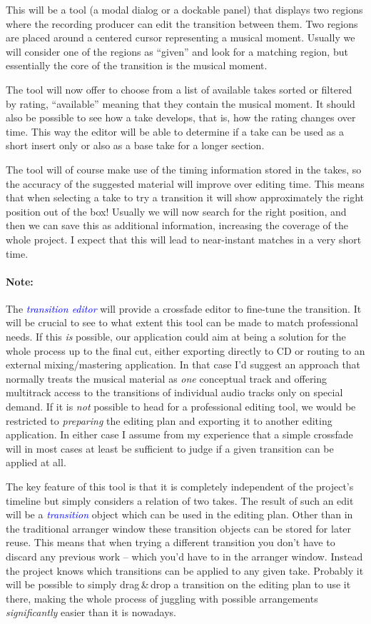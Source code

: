 \documentclass[11pt,a4paper]{article}
\newcommand*{\term}[1]{\textcolor{blue}{\emph{#1}}}
\begin{document}
This will be a tool (a modal dialog or a dockable panel) that displays two
regions where the recording producer can edit the transition between them.
Two regions are placed around a centered cursor representing a musical moment.
Usually we will consider one of the regions as “given” and look for a matching
region, but essentially the core of the transition is the musical moment.

The tool will now offer to choose from a list of available takes sorted or filtered
by rating, “available” meaning that they contain the musical moment.
It should also be possible to see how a take develops, that is, how the rating
changes over time.
This way the editor will be able to determine if a take can be used as a short
insert only or also as a base take for a longer section.

The tool will of course make use of the timing information stored in the takes,
so the accuracy of the suggested material will improve over editing time.
This means that when selecting a take to try a transition it will show
approximately the right position out of the box!
Usually we will now search for the right position, and then we can save this as
additional information, increasing the coverage of the whole project.
I expect that this will lead to near-instant matches in a very short time.

\paragraph{Note:}
The \term{transition editor} will provide a crossfade editor to fine-tune the
transition.
It will be crucial to see to what extent this tool can be made to match
professional needs.
If this \emph{is} possible, our application could aim at being a solution for the
whole process up to the final cut, either exporting directly to CD or routing to
an external mixing/mastering application.
In that case I'd suggest an approach that normally treats the musical material
as \emph{one} conceptual track and offering multitrack access to the transitions
of individual audio tracks only on special demand.
If it is \emph{not} possible to head for a professional editing tool, we would be
restricted to \emph{preparing} the editing plan and exporting it to another
editing application.
In either case I assume from my experience that a simple crossfade will in most
cases at least be sufficient to judge if a given transition can be applied at
all.

\medskip
The key feature of this tool is that it is completely independent of the
project's timeline but simply considers a relation of two takes.
The result of such an edit will be a \term{transition} object which can be used
in the editing plan.
Other than in the traditional arranger window these transition objects can be
stored for later reuse.
This means that when trying a different transition you don't have to discard any
previous work -- which you'd have to in the arranger window.
Instead the project knows which transitions can be applied to any given take.
Probably it will be possible to simply drag\,\&\,drop a transition on the
editing plan to use it there, making the whole process of juggling with possible
arrangements \emph{significantly} easier than it is nowadays.
\end{document}
